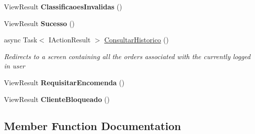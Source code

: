 \begin{DoxyCompactItemize}
\mbox{\label{classmvc_j_j_m_s_1_1_controllers_1_1_menu_cliente_controller_a328510da7f857e253e57ac44de6de83c}} 
View\+Result {\bfseries Classificaoes\+Invalidas} ()
\item 
\mbox{\label{classmvc_j_j_m_s_1_1_controllers_1_1_menu_cliente_controller_afc3a11add77380e9cef2ca9a48ff6169}} 
View\+Result {\bfseries Sucesso} ()
\item 
async Task$<$ I\+Action\+Result $>$ \mbox{\hyperlink{classmvc_j_j_m_s_1_1_controllers_1_1_menu_cliente_controller_a6aadfeccdbb52ae6a555b2ee00c4a3f0}{Consultar\+Historico}} ()
\begin{DoxyCompactList}\small\item\em Redirects to a screen containing all the orders associated with the currently logged in user \end{DoxyCompactList}\item 
\mbox{\label{classmvc_j_j_m_s_1_1_controllers_1_1_menu_cliente_controller_a91fd91fa2b700ee34740d2e68fb0d40f}} 
View\+Result {\bfseries Requisitar\+Encomenda} ()
\item 
\mbox{\label{classmvc_j_j_m_s_1_1_controllers_1_1_menu_cliente_controller_a4aa4e2445d00a056a9d5727676e65704}} 
View\+Result {\bfseries Cliente\+Bloqueado} ()
\end{DoxyCompactItemize}


\subsection{Member Function Documentation}
\mbox{\label{classmvc_j_j_m_s_1_1_controllers_1_1_menu_cliente_controller_a2d3e5123426f07356591f476a5c2e6e1}} 

